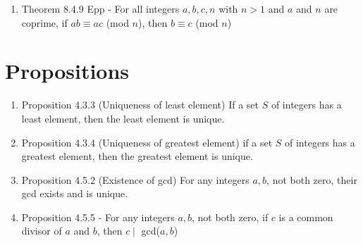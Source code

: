 \documentclass[a4paper]{article}
\begin{document}
\begin{enumerate}
\begin{enumerate}
		\item $a^m \equiv c^m$ (mod $n$), for all positive integers $m$
	\end{enumerate}
	$\rightarrow$ Corollary 8.4.4 Epp - 
	\begin{center}
		$ab \equiv$ $[(a$ mod $n)(b$ mod $n)]$ (mod $n$)
	\end{center}
	In particular, if $m$ is a positive integer, then
	\begin{center}
		$a^m \equiv [(a$ mod $n)^m]$ (mod $n$)
	\end{center}
	\item[] Theorem 8.4.9 Epp - For all integers $a,b,c,n$ with $n>1$ and $a$ and $n$ are coprime, if $ab\equiv ac$ (mod $n$), then $b\equiv c$ (mod $n$)
\end{enumerate}

\section{Propositions}
\begin{enumerate}
	\item[] Proposition 4.3.3 (Uniqueness of least element) If a set $S$ of integers has a least element, then the least element is unique.
	\item[] Proposition 4.3.4 (Uniqueness of greatest element) if a set $S$ of integers has a greatest element, then the greatest element is unique.
	\item[] Proposition 4.5.2 (Existence of gcd) For any integers $a, b$, not both zero, their gcd exists and is unique.
	\item[] Proposition 4.5.5 - For any integers $a, b$, not both zero, if $c$ is a common divisor of $a$ and $b$, then $c\mid$ gcd($a,b$)
\end{enumerate}
\end{document}
